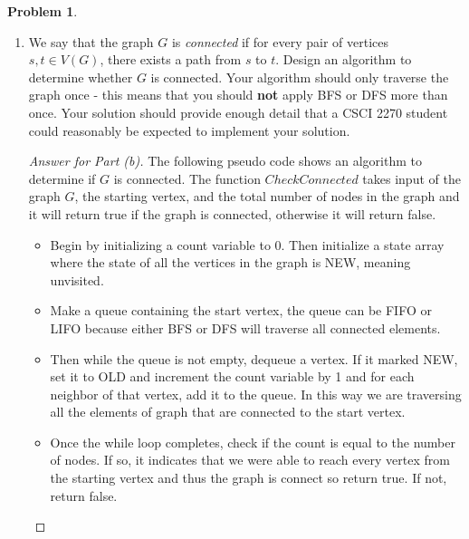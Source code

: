 \documentclass[11pt]{article}
\theoremstyle{definition}
\theoremstyle{definition}
\newtheorem{required}{Problem}
\theoremstyle{definition}
\begin{document}
\begin{required}
\begin{enumerate}[label=(\alph*)]
\begin{proof}[Answer for Part (a)]
\begin{python}
{	while Q is not empty {
		(p,x)= deQueue(Q) 	#get vertex x out of Q
		if state[x]==NEW {
			state[x]=OLD 	#mark it as visited
			pred[x]=p 	#save how we got to x
			dist[x]=dist[p]+1	 	#store the distance to x 
			for each neighbor y of x {
				enqueue(Q, (x,y)) 	#add y to the Q
			}
		}
	}

	if (state[t] == OLD && dist[t] ==k) { 	#if t has been visited and the distance to t is the same as k, then there does exist a path from s to t in G that consists of k edges
		return true
	}
	else {
		return false
	}
}
\end{python}
\end{proof}



\newpage
\item We say that the graph $G$ is \textit{connected} if for every pair of vertices $s, t \in V(G)$, there exists a path from $s$ to $t$. Design an algorithm to determine whether $G$ is connected. Your algorithm should only traverse the graph once - this means that you should \textbf{not} apply BFS or DFS more than once. Your solution should provide enough detail that a CSCI 2270 student could reasonably be expected to implement your solution.

\begin{proof}[Answer for Part (b)]

The following pseudo code shows an algorithm to determine if $G$ is connected. The function $CheckConnected$ takes input of the graph $G$, the starting vertex, and the total number of nodes in the graph and it will return true if the graph is connected, otherwise it will return false. 
\begin{itemize}
\item Begin by initializing a count variable to 0. Then initialize a state array where the state of all the vertices in the graph is NEW, meaning unvisited.
\item Make a queue containing the start vertex, the queue can be FIFO or LIFO because either BFS or DFS will traverse all connected elements. 
\item Then while the queue is not empty, dequeue a vertex. If it marked NEW,  set it to OLD and increment the count variable by 1 and for each neighbor of that vertex, add it to the queue. In this way we are traversing all the elements of graph that are connected to the start vertex. 
\item Once the while loop completes, check if the count is equal to the number of nodes. If so, it indicates that we were able to reach every vertex from the starting vertex and thus the graph is connect so return true. If not, return false. \\
\end{itemize}


\end{proof}
\end{enumerate}
\end{required}
\end{document}
